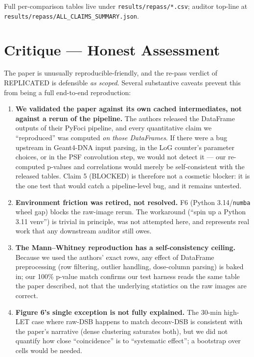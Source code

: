 \documentclass[11pt]{article}
\begin{document}
Full per-comparison tables live under \texttt{results/repass/*.csv}; auditor
top-line at \texttt{results/repass/ALL\_CLAIMS\_SUMMARY.json}.

\section{Critique --- Honest Assessment}

The paper is unusually reproducible-friendly, and the re-pass verdict of
\textsc{REPLICATED} is defensible \emph{as scoped}. Several substantive caveats
prevent this from being a full end-to-end reproduction:

\begin{enumerate}

\item \textbf{We validated the paper against its own cached intermediates, not
against a rerun of the pipeline.} The authors released the DataFrame outputs of
their PyFoci pipeline, and every quantitative claim we ``reproduced'' was
computed \emph{on those DataFrames}. If there were a bug upstream in Geant4-DNA
input parsing, in the LoG counter's parameter choices, or in the PSF convolution
step, we would not detect it --- our re-computed p-values and correlations would
merely be self-consistent with the released tables. Claim 5 (BLOCKED) is
therefore not a cosmetic blocker: it is the one test that would catch a
pipeline-level bug, and it remains untested.

\item \textbf{Environment friction was retired, not resolved.} F6 (Python
3.14/\texttt{numba} wheel gap) blocks the raw-image rerun. The workaround
(``spin up a Python 3.11 venv'') is trivial in principle, was not attempted here,
and represents real work that any downstream auditor still owes.

\item \textbf{The Mann--Whitney reproduction has a self-consistency ceiling.}
Because we used the authors' exact rows, any effect of DataFrame preprocessing
(row filtering, outlier handling, dose-column parsing) is baked in; our 100\%
p-value match confirms our test harness reads the same table the paper
described, not that the underlying statistics on the raw images are correct.

\item \textbf{Figure 6's single exception is not fully explained.} The 30-min
high-LET case where raw-DSB happens to match deconv-DSB is consistent with the
paper's narrative (dense clustering saturates both), but we did not quantify how
close ``coincidence'' is to ``systematic effect''; a bootstrap over cells would
be needed.


\end{enumerate}
\end{document}
